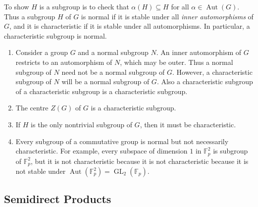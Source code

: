 \begin{remark}
  To show \( H \) is a subgroup is to check that \( \alpha(H) \subseteq H \) for all \( \alpha \in \operatorname{Aut}(G) \).
  Thus a subgroup \( H \) of \( G \) is normal if it is stable under all \emph{inner automorphisms} of \( G \), and it is characteristic if it is stable under all automorphisms.
  In particular, a characteristic subgroup is normal.
\end{remark}

\begin{remark}
  \begin{enumerate}
    \item Consider a group \( G \) and a normal subgroup \( N \).
      An inner automorphism of \( G \) restricts to an automorphism of \( N \), which may be outer.
      Thus a normal subgroup of \( N \) need not be a normal subgroup of \( G \).
      However, a characteristic subgroup of \( N \) will be a normal subgroup of \( G \).
      Also a characteristic subgroup of a characteristic subgroup is a characteristic subgroup.
    \item The centre \( Z(G) \) of \( G \) is a characteristic subgroup.
    \item If \( H \) is the only nontrivial subgroup of \( G \), then it must be characteristic.
    \item Every subgroup of a commutative group is normal but not necessarily characteristic.
      For example, every subspace of dimension \( 1 \) in \( \mathbb{F}^2_p \) is subgroup of \( \mathbb{F}_p^2 \), but it is not characteristic because it is not characteristic because it is not stable under \( \operatorname{Aut}(\mathbb{F}^2_p) = \operatorname{GL}_2(\mathbb{F}_p) \).
  \end{enumerate}
\end{remark}

\subsection{Semidirect Products}


